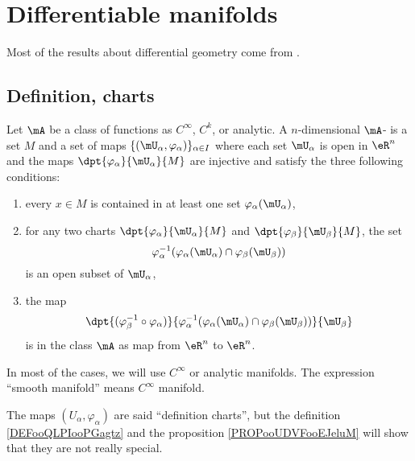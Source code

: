 
\section{Differentiable manifolds}

Most of the results about differential geometry come from \cite{kobayashi, madore, Helgason, ms_book, dgbook}.

\subsection{Definition, charts}

\begin{definition}		\label{DEFooVMWRooGQYJwl}
	Let \( \mA\) be a class of functions as \(  C^{\infty}\), \( C^k\), or analytic. A $n$-dimensional \( \mA\)- is a set $M$ and a set of maps $\{(\mU_{\alpha},\varphi_{\alpha})\}_{\alpha\in I}$ where each set $\mU_{\alpha}$ is open in $\eR^n$ and the maps $\dpt{\varphi_{\alpha}}{\mU_{\alpha}}{M}$ are injective and satisfy the three following conditions:

	\begin{enumerate}
		\item \label{ITEMooUOXXooAzRrAk}
		      every $x\in M$ is contained in at least one set $\varphi_{\alpha}(\mU_{\alpha})$,
		\item 	\label{ITEMooQHIYooBISPjL}
		      for any two charts $\dpt{\varphi_{\alpha}}{\mU_{\alpha}}{M}$ and $\dpt{\varphi_{\beta}}{\mU_{\beta}}{M}$, the set
		      \begin{equation}
			      \varphi_{\alpha}^{-1}( \varphi_{\alpha}(\mU_{\alpha})\cap\varphi_{\beta}(\mU_{\beta}) )
		      \end{equation}
		      is an open subset of $\mU_{\alpha}$,
		\item \label{ITEMooHICSooDrPwuV}
		      the map
		      \begin{equation}
			      \dpt{  (\varphi_{\beta}^{-1}\circ\varphi_{\alpha})  }{   \varphi_{\alpha}^{-1}( \varphi_{\alpha}(\mU_{\alpha})\cap\varphi_{\beta}(\mU_{\beta})  )   }{\mU_{\beta}}
		      \end{equation}
		      is in the class \( \mA\) as map from $\eR^n$ to $\eR^n$.
	\end{enumerate}
	In most of the cases, we will use \(  C^{\infty}\) or analytic manifolds. The expression ``smooth manifold'' means \(  C^{\infty}\) manifold.

	The maps \( (U_{\alpha}, \varphi_{\alpha})\) are said ``definition charts'', but the definition \ref{DEFooQLPIooPGagtz} and the proposition \ref{PROPooUDVFooEJeluM} will show that they are not really special.
\end{definition}

